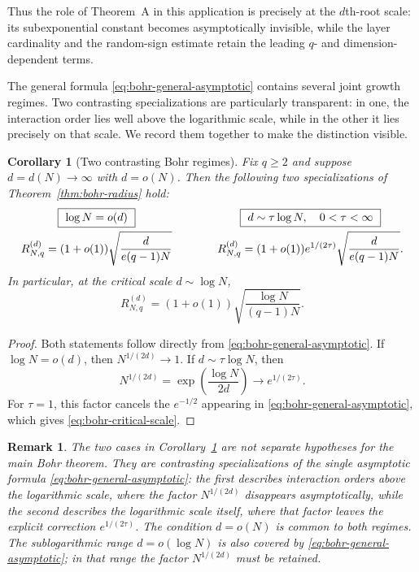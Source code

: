 \documentclass[11pt,a4paper]{article}
\numberwithin{equation}{section}
\theoremstyle{cleanplain}
\newtheorem{corollary}[corollary]{Corollary}
\theoremstyle{cleandefinition}
\theoremstyle{cleanremark}
\newtheorem{remark}[remark]{Remark}
\begin{document}
Thus the role of Theorem~A in this application is precisely at the
$d$th-root scale: its subexponential constant becomes asymptotically invisible,
while the layer cardinality and the random-sign estimate retain the leading
$q$- and dimension-dependent terms.

The general formula \eqref{eq:bohr-general-asymptotic} contains several
joint growth regimes.  Two contrasting specializations are particularly
transparent: in one, the interaction order lies well above the logarithmic
scale, while in the other it lies precisely on that scale.  We record them
together to make the distinction visible.

\begin{corollary}[Two contrasting Bohr regimes]\label{cor:bohr-complementary-regimes}
Fix $q\geq2$ and suppose $d=d(N)\to\infty$ with $d=o(N)$.  Then the following
two specializations of Theorem~\ref{thm:bohr-radius} hold:
\[
\begin{array}{c@{\qquad\qquad}c}
\boxed{\ \log N=o(d)\ }
&
\boxed{\ d\sim\tau\log N,\quad 0<\tau<\infty\ }\\[2mm]
\displaystyle
R_{N,q}^{(d)}
=(1+o(1))\sqrt{\frac{d}{e(q-1)N}}
&
\displaystyle
R_{N,q}^{(d)}
=(1+o(1))e^{1/(2\tau)}
\sqrt{\frac{d}{e(q-1)N}}.
\end{array}
\]
In particular, at the critical scale $d\sim\log N$,
\begin{equation}\label{eq:bohr-critical-scale}
 R_{N,q}^{(d)}
 =(1+o(1))\sqrt{\frac{\log N}{(q-1)N}}.
\end{equation}
\end{corollary}

\begin{proof}
Both statements follow directly from \eqref{eq:bohr-general-asymptotic}.
If $\log N=o(d)$, then $N^{1/(2d)}\to1$.  If
$d\sim\tau\log N$, then
\[
 N^{1/(2d)}
 =\exp\left(\frac{\log N}{2d}\right)
 \longrightarrow e^{1/(2\tau)}.
\]
For $\tau=1$, this factor cancels the $e^{-1/2}$ appearing in
\eqref{eq:bohr-general-asymptotic}, which gives
\eqref{eq:bohr-critical-scale}.
\end{proof}

\begin{remark}
The two cases in Corollary~\ref{cor:bohr-complementary-regimes} are not separate
hypotheses for the main Bohr theorem.  They are contrasting specializations
of the single asymptotic formula \eqref{eq:bohr-general-asymptotic}: the first
describes interaction orders above the logarithmic scale, where the factor
$N^{1/(2d)}$ disappears asymptotically, while the second describes the
logarithmic scale itself, where that factor leaves the explicit correction
$e^{1/(2\tau)}$.  The condition $d=o(N)$ is common to both regimes.  The sublogarithmic range
$d=o(\log N)$ is also covered by \eqref{eq:bohr-general-asymptotic}; in that
range the factor $N^{1/(2d)}$ must be retained.
\end{remark}
\end{document}
